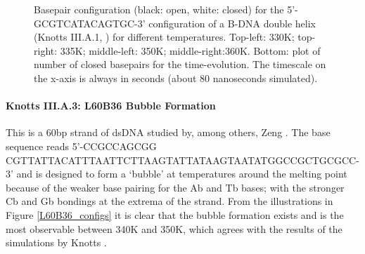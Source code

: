 \begin{figure}[h] \begin{minipage}{7cm}
 \end{minipage} \begin{minipage}{7cm}  \end{minipage}
\begin{minipage}{7cm}
 \end{minipage} \begin{minipage}{7cm}\end{minipage}\begin{center}

\caption{Basepair configuration (black: open, white: closed) for the 5'-GCGTCATACAGTGC-3' configuration of a B-DNA double helix (Knotts III.A.1, \cite{knotts2007coarse}) for different temperatures. Top-left: 330K; top-right: 335K; middle-left: 350K; middle-right:360K. Bottom: plot of number of closed basepairs for the time-evolution. The timescale on the x-axis is always in seconds (about 80 nanoseconds simulated).  } \label{knotts1_configs}\end{center}
\end{figure}

\paragraph{Knotts III.A.3: L60B36 Bubble Formation} This is a 60bp strand of dsDNA studied by, among others, Zeng \etal \cite{zeng2003length}.
The base sequence reads 5'-CCGCCAGCGG CGTTATTACATTTAATTCTTAAGTATTATAAGTAATATGGCCGCTGCGCC-3' and is designed to form a `bubble' at temperatures around the melting point because of the weaker base pairing for the Ab and Tb bases; with the stronger Cb and Gb bondings at the extrema of the strand.
From the illustrations in Figure \ref{L60B36_configs} it is clear that the bubble formation exists and is the most observable between 340K and 350K, which agrees with the results of the simulations by Knotts \etal \cite{knotts2007coarse}.

